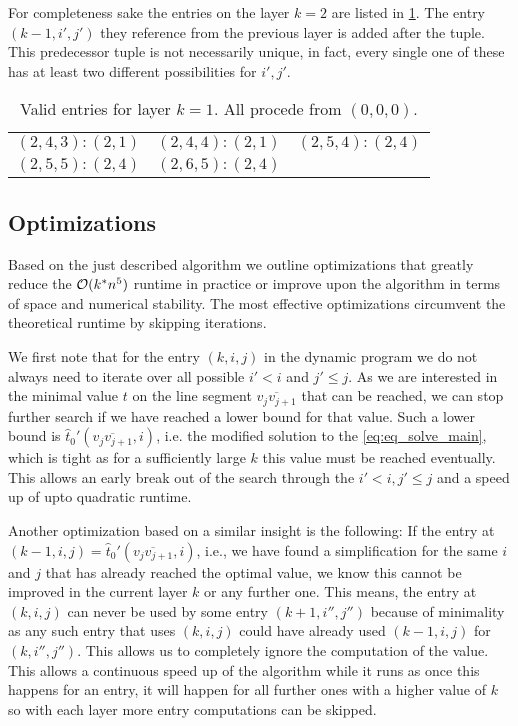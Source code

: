 For completeness sake the entries on the layer \(k = 2\) are listed in \cref{tab:exlayer2}. The entry \((k - 1, i', j')\) they reference from the previous layer is added after the tuple. This predecessor tuple is not necessarily unique, in fact, every single one of these has at least two different possibilities for \(i', j'\).
\begin{table}[h]
\centering
\begin{tabular}{|ccc|}
\hline
$(2,4,3):(2, 1)$ & $(2,4,4):(2, 1)$ & $(2,5,4):(2,4)$ \\
$(2,5,5):(2,4)$ & $(2,6,5):(2,4)$ & \\
\hline
\end{tabular}
\caption{Valid entries for layer \(k = 1\). All procede from \((0,0,0)\).}
\label{tab:exlayer2}
\end{table}

\subsection{Optimizations}
\label{ssec:optimizations}
Based on the just described algorithm we outline optimizations that greatly reduce the \(\mathcal{O}(k^*n^5)\) runtime in practice or improve upon the algorithm in terms of space and numerical stability. The most effective optimizations circumvent the theoretical runtime by skipping iterations. 

We first note that for the entry \((k, i, j)\) in the dynamic program we do not always need to iterate over all possible \(i' < i\) and \(j' \leq j\). As we are interested in the minimal value \(t\) on the line segment \(\overline{v_{j}v_{j+1}}\) that can be reached, we can stop further search if we have reached a lower bound for that value. Such a lower bound is \(\hat t_0'(\overline{v_{j}v_{j+1}}, i)\), i.e. the modified solution to the \cref{eq:eq_solve_main}, which is tight as for a sufficiently large \(k\) this value must be reached eventually. This allows an early break out of the search through the \(i' < i, j'\leq j\) and a speed up of upto quadratic runtime. 

Another optimization based on a similar insight is the following: If the entry at \((k-1, i, j) = \hat t_0'(\overline{v_{j}v_{j+1}}, i)\), i.e., we have found a simplification for the same \(i\) and \(j\) that has already reached the optimal value, we know this cannot be improved in the current layer \(k\) or any further one. This means, the entry at \((k, i, j)\) can never be used by some entry \((k + 1, i'', j'')\) because of minimality as any such entry that uses \((k, i, j)\) could have already used \((k-1, i, j)\) for \((k, i'', j'')\). This allows us to completely ignore the computation of the value. This allows a continuous speed up of the algorithm while it runs as once this happens for an entry, it will happen for all further ones with a higher value of \(k\) so with each layer more entry computations can be skipped. 


